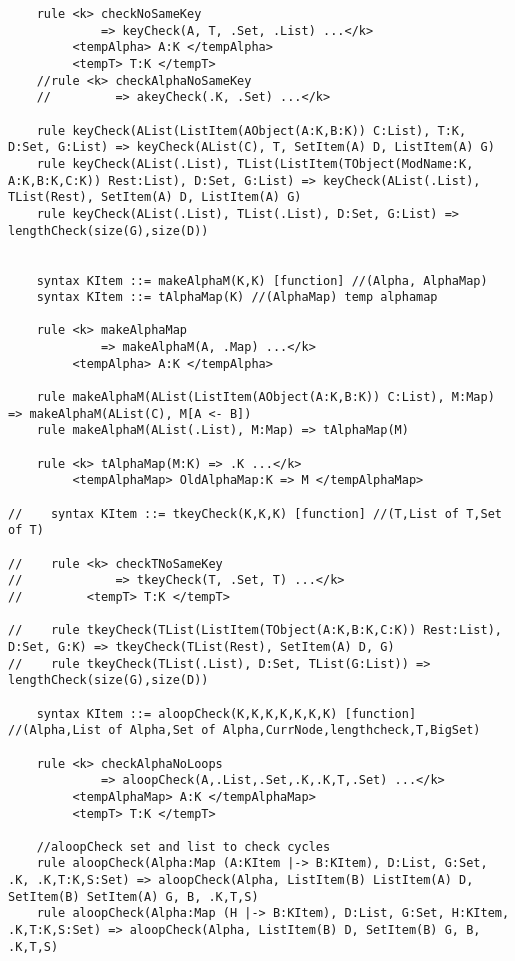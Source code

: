 \begin{lstlisting}
    rule <k> checkNoSameKey
             => keyCheck(A, T, .Set, .List) ...</k>
         <tempAlpha> A:K </tempAlpha>
         <tempT> T:K </tempT>
    //rule <k> checkAlphaNoSameKey
    //         => akeyCheck(.K, .Set) ...</k>

    rule keyCheck(AList(ListItem(AObject(A:K,B:K)) C:List), T:K, D:Set, G:List) => keyCheck(AList(C), T, SetItem(A) D, ListItem(A) G)
    rule keyCheck(AList(.List), TList(ListItem(TObject(ModName:K, A:K,B:K,C:K)) Rest:List), D:Set, G:List) => keyCheck(AList(.List), TList(Rest), SetItem(A) D, ListItem(A) G)
    rule keyCheck(AList(.List), TList(.List), D:Set, G:List) => lengthCheck(size(G),size(D))


    syntax KItem ::= makeAlphaM(K,K) [function] //(Alpha, AlphaMap)
    syntax KItem ::= tAlphaMap(K) //(AlphaMap) temp alphamap

    rule <k> makeAlphaMap
             => makeAlphaM(A, .Map) ...</k>
         <tempAlpha> A:K </tempAlpha>

    rule makeAlphaM(AList(ListItem(AObject(A:K,B:K)) C:List), M:Map) => makeAlphaM(AList(C), M[A <- B])
    rule makeAlphaM(AList(.List), M:Map) => tAlphaMap(M)

    rule <k> tAlphaMap(M:K) => .K ...</k>
         <tempAlphaMap> OldAlphaMap:K => M </tempAlphaMap>

//    syntax KItem ::= tkeyCheck(K,K,K) [function] //(T,List of T,Set of T)

//    rule <k> checkTNoSameKey
//             => tkeyCheck(T, .Set, T) ...</k>
//         <tempT> T:K </tempT>

//    rule tkeyCheck(TList(ListItem(TObject(A:K,B:K,C:K)) Rest:List), D:Set, G:K) => tkeyCheck(TList(Rest), SetItem(A) D, G)
//    rule tkeyCheck(TList(.List), D:Set, TList(G:List)) => lengthCheck(size(G),size(D))

    syntax KItem ::= aloopCheck(K,K,K,K,K,K,K) [function] //(Alpha,List of Alpha,Set of Alpha,CurrNode,lengthcheck,T,BigSet)

    rule <k> checkAlphaNoLoops
             => aloopCheck(A,.List,.Set,.K,.K,T,.Set) ...</k>
         <tempAlphaMap> A:K </tempAlphaMap>
         <tempT> T:K </tempT>

    //aloopCheck set and list to check cycles
    rule aloopCheck(Alpha:Map (A:KItem |-> B:KItem), D:List, G:Set, .K, .K,T:K,S:Set) => aloopCheck(Alpha, ListItem(B) ListItem(A) D, SetItem(B) SetItem(A) G, B, .K,T,S)
    rule aloopCheck(Alpha:Map (H |-> B:KItem), D:List, G:Set, H:KItem, .K,T:K,S:Set) => aloopCheck(Alpha, ListItem(B) D, SetItem(B) G, B, .K,T,S)


\end{lstlisting}
